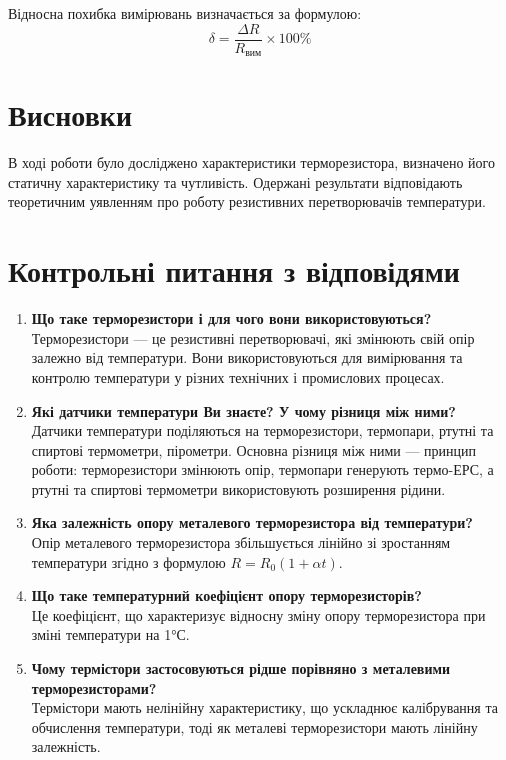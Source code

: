 \documentclass[a4paper]{article}
\begin{document}
Відносна похибка вимірювань визначається за формулою:
\begin{equation}
    \delta = \frac{\Delta R}{R_{вим}} \times 100\%
\end{equation}

\section*{Висновки}
В ході роботи було досліджено характеристики терморезистора, визначено його статичну характеристику та чутливість. Одержані результати відповідають теоретичним уявленням про роботу резистивних перетворювачів температури.

\section*{Контрольні питання з відповідями}
\begin{enumerate}
    \item \textbf{Що таке терморезистори і для чого вони використовуються?}\\
    Терморезистори — це резистивні перетворювачі, які змінюють свій опір залежно від температури. Вони використовуються для вимірювання та контролю температури у різних технічних і промислових процесах.
    
    \item \textbf{Які датчики температури Ви знаєте? У чому різниця між ними?}\\
    Датчики температури поділяються на терморезистори, термопари, ртутні та спиртові термометри, пірометри. Основна різниця між ними — принцип роботи: терморезистори змінюють опір, термопари генерують термо-ЕРС, а ртутні та спиртові термометри використовують розширення рідини.
    
    \item \textbf{Яка залежність опору металевого терморезистора від температури?}\\
    Опір металевого терморезистора збільшується лінійно зі зростанням температури згідно з формулою $R = R_0 (1 + \alpha t)$.
    
    \item \textbf{Що таке температурний коефіцієнт опору терморезисторів?}\\
    Це коефіцієнт, що характеризує відносну зміну опору терморезистора при зміні температури на 1°С.
    
    \item \textbf{Чому термістори застосовуються рідше порівняно з металевими терморезисторами?}\\
    Термістори мають нелінійну характеристику, що ускладнює калібрування та обчислення температури, тоді як металеві терморезистори мають лінійну залежність.
    
\end{enumerate}
\end{document}

